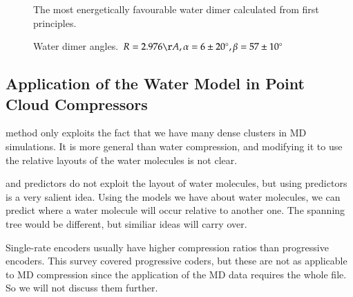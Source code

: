 \documentclass{report}
\newcommand{\degree}{\ensuremath{^\circ}}
\begin{document}
\begin{figure}[h]
\centering
{}
\caption{The most energetically favourable water dimer calculated from first
  principles.}
\label{fig:dimer}
\end{figure}

\begin{figure}[h]
\centering
{}
\caption{Water dimer angles. $R = 2.976\AA, \alpha = 6 \pm 20\degree, \beta =
  57 \pm 10\degree$}
\label{fig:dimr-angle}
\end{figure}

\subsection{Application of the Water Model in Point Cloud Compressors}

\citet{omeltchenko2000sls} method only exploits the fact that we have many
dense clusters in MD simulations. It is more general than water compression,
and modifying it to use the relative layouts of the water molecules is not
clear.

\citet{merrycomp} and \citet{gumholdcomp} predictors do not exploit the layout
of water molecules, but using predictors is a very salient idea. Using the
models we have about water molecules, we can predict where a water molecule
will occur relative to another one. The spanning tree would be different, but
similiar ideas will carry over.

Single-rate encoders usually have higher compression ratios than progressive
encoders. This survey covered progressive coders, but these are not as
applicable to MD compression since the application of the MD data requires the
whole file. So we will not discuss them further.
\end{document}
